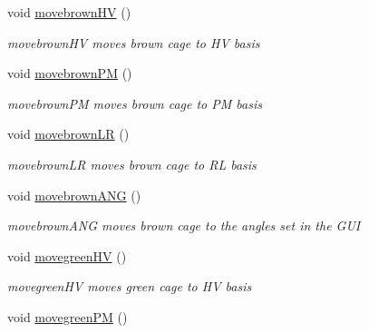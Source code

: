 \begin{DoxyCompactItemize}
\mbox{\label{classcagecontrol_a88d660f6b66569caf3b78ad9538b0826}} 
void \hyperlink{classcagecontrol_a88d660f6b66569caf3b78ad9538b0826}{movebrown\+HV} ()
\begin{DoxyCompactList}\small\item\em movebrown\+HV moves brown cage to HV basis \end{DoxyCompactList}\item 
\mbox{\label{classcagecontrol_a929fc957acccf06e36c11af32b49168b}} 
void \hyperlink{classcagecontrol_a929fc957acccf06e36c11af32b49168b}{movebrown\+PM} ()
\begin{DoxyCompactList}\small\item\em movebrown\+PM moves brown cage to PM basis \end{DoxyCompactList}\item 
\mbox{\label{classcagecontrol_aa146d98da4d107f29b086c4136d05f58}} 
void \hyperlink{classcagecontrol_aa146d98da4d107f29b086c4136d05f58}{movebrown\+LR} ()
\begin{DoxyCompactList}\small\item\em movebrown\+LR moves brown cage to RL basis \end{DoxyCompactList}\item 
\mbox{\label{classcagecontrol_a8fe48c38d5ed672375ba50aa52c4671e}} 
void \hyperlink{classcagecontrol_a8fe48c38d5ed672375ba50aa52c4671e}{movebrown\+A\+NG} ()
\begin{DoxyCompactList}\small\item\em movebrown\+A\+NG moves brown cage to the angles set in the G\+UI \end{DoxyCompactList}\item 
\mbox{\label{classcagecontrol_af4185b8a7157c810beb1533dba201e2d}} 
void \hyperlink{classcagecontrol_af4185b8a7157c810beb1533dba201e2d}{movegreen\+HV} ()
\begin{DoxyCompactList}\small\item\em movegreen\+HV moves green cage to HV basis \end{DoxyCompactList}\item 
\mbox{\label{classcagecontrol_aea81bb0a641e220fd5f6f01baba0b222}} 
void \hyperlink{classcagecontrol_aea81bb0a641e220fd5f6f01baba0b222}{movegreen\+PM} ()

\end{DoxyCompactItemize}
